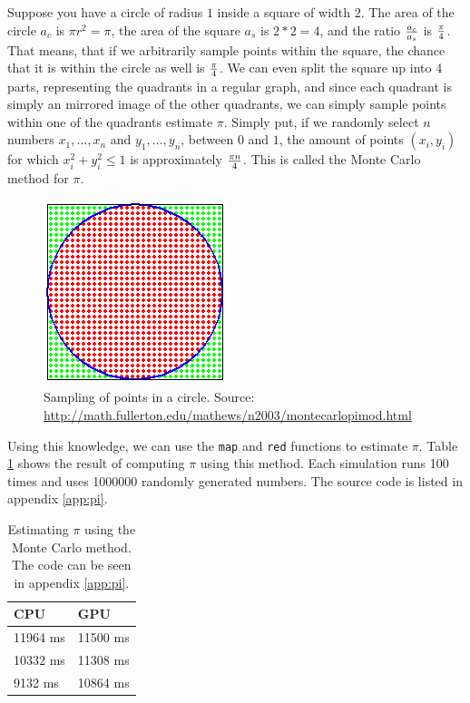 Suppose you have a circle of radius $1$ inside a square of width
$2$. The area of the circle $a_c$ is $\pi r^2 = \pi$, the area of the
square $a_s$ is $2*2=4$, and the ratio $a_c \over a_s$ is $\pi \over
4$. That means, that if we arbitrarily sample points within the
square, the chance that it is within the circle as well is $\pi \over
4$. We can even split the square up into 4 parts, representing the
quadrants in a regular graph, and since each quadrant is simply an
mirrored image of the other quadrants, we can simply sample points
within one of the quadrants estimate $\pi$. Simply put, if we randomly
select $n$ numbers $x_1, \ldots, x_n$ and $y_1, \ldots, y_n$, between
$0$ and $1$, the amount of points $(x_i, y_i)$ for which $x_i^2 +
y_i^2 \leq 1$ is approximately $\pi n \over 4$. This is called the
Monte Carlo method for $\pi$.

\begin{figure}[h]
  \center
  \caption{Sampling of points in a circle. Source: \url{http://math.fullerton.edu/mathews/n2003/montecarlopimod.html}}
  \label{fig:pi1}
  \includegraphics[scale=0.5]{figures/pi1.png}
\end{figure}

Using this knowledge, we can use the \texttt{map} and \texttt{red}
functions to estimate $\pi$. Table \ref{table:pi} shows the result of
computing $\pi$ using this method. Each simulation runs 100 times and
uses 1000000 randomly generated numbers. The source code is listed in
appendix \ref{app:pi}. 

\begin{table}
  \center
  \label{table:pi}
  \begin{tabular}{l|l}
    CPU & GPU \\ \hline
    11964 ms & 11500 ms \\ \hline
    10332 ms & 11308 ms \\ \hline
    9132 ms & 10864 ms \\ \hline
  \end{tabular}
  \caption{Estimating $\pi$ using the Monte Carlo method. The code can
  be seen in appendix \ref{app:pi}.}
\end{table}

